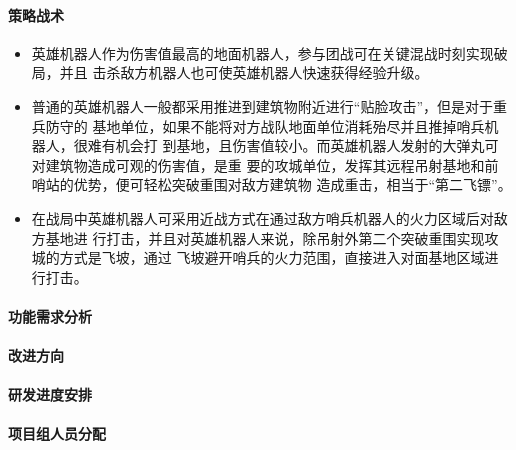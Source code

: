     \paragraph{策略战术}


        \begin{itemize}
            \item 英雄机器人作为伤害值最高的地面机器人，参与团战可在关键混战时刻实现破局，并且 击杀敌方机器人也可使英雄机器人快速获得经验升级。
            \item 普通的英雄机器人一般都采用推进到建筑物附近进行“贴脸攻击”，但是对于重兵防守的 基地单位，如果不能将对方战队地面单位消耗殆尽并且推掉哨兵机器人，很难有机会打 到基地，且伤害值较小。而英雄机器人发射的大弹丸可对建筑物造成可观的伤害值，是重 要的攻城单位，发挥其远程吊射基地和前哨站的优势，便可轻松突破重围对敌方建筑物 造成重击，相当于“第二飞镖”。
            \item 在战局中英雄机器人可采用近战方式在通过敌方哨兵机器人的火力区域后对敌方基地进 行打击，并且对英雄机器人来说，除吊射外第二个突破重围实现攻城的方式是飞坡，通过 飞坡避开哨兵的火力范围，直接进入对面基地区域进行打击。
        \end{itemize}
    
    \paragraph{功能需求分析}

    
    \paragraph{改进方向}


    \paragraph{研发进度安排}


    \paragraph{项目组人员分配}

    